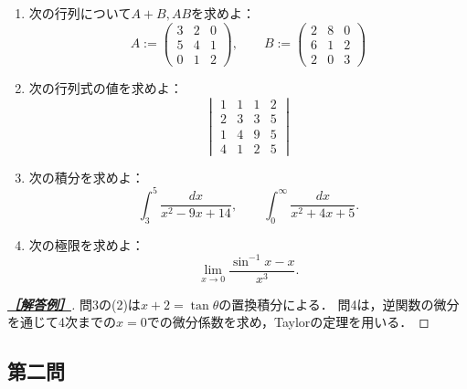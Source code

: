 \documentclass[uplatex,dvipdfmx]{jsarticle}
\begin{document}
\begin{tcolorbox}[colframe=ForestGreen, colback=ForestGreen!10!white,breakable,colbacktitle=ForestGreen!40!white,coltitle=black,fonttitle=\bfseries\sffamily,
    title=第１問]
    \begin{problem}\mbox{}
        \begin{enumerate}[{問}1]
            \item 次の行列について$A+B,AB$を求めよ：
            \[A:=\begin{pmatrix}
                3&2&0\\5&4&1\\0&1&2
            \end{pmatrix},\qquad B:=\begin{pmatrix}
                2&8&0\\6&1&2\\2&0&3
            \end{pmatrix}\]
            \item 次の行列式の値を求めよ：
            \[\begin{vmatrix}
                1&1&1&2\\2&3&3&5\\1&4&9&5\\4&1&2&5
            \end{vmatrix}\]
            \item 次の積分を求めよ：
            \[\int^5_3\frac{dx}{x^2-9x+14},\qquad\int^\infty_0\frac{dx}{x^2+4x+5}.\]
            \item 次の極限を求めよ：
            \[\lim_{x\to0}\frac{\sin^{-1}x-x}{x^3}.\]
        \end{enumerate}
    \end{problem}
\end{tcolorbox}
\begin{proof}[\textbf{\underline{［解答例］}}]
    問3の(2)は$x+2=\tan\theta$の置換積分による．
    問4は，逆関数の微分を通じて4次までの$x=0$での微分係数を求め，Taylorの定理を用いる．
\end{proof}

\subsection{第二問}
\end{document}
